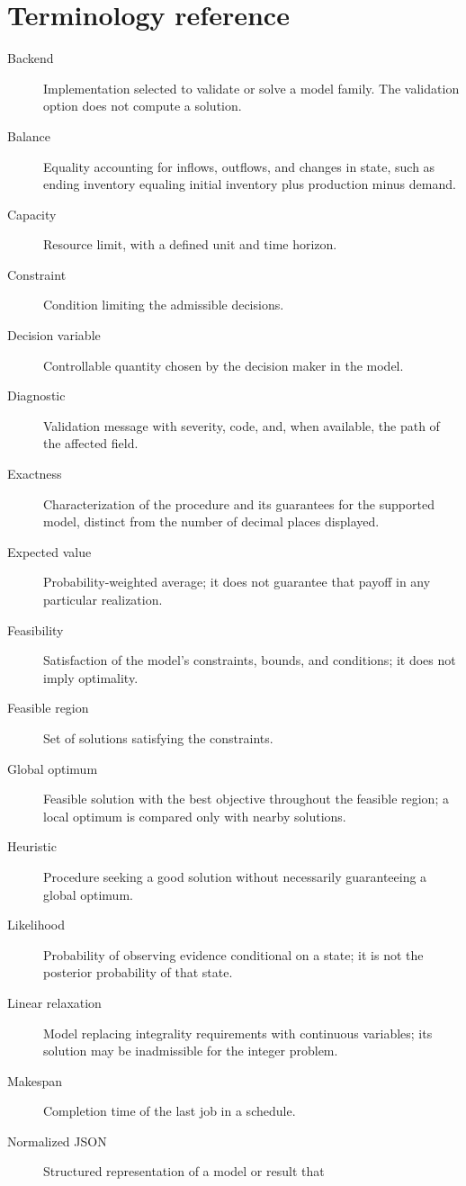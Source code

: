 \chapter{Terminology reference}
\label{chap:terminos}
\begin{description}
 \item[Backend] Implementation selected to validate or solve a model family.
 The validation option does not compute a solution.
 \item[Balance] Equality accounting for inflows, outflows, and changes in state,
 such as ending inventory equaling initial inventory plus production minus demand.
 \item[Capacity] Resource limit, with a defined unit and time horizon.
 \item[Constraint] Condition limiting the admissible decisions.
 \item[Decision variable] Controllable quantity chosen by the decision maker in the model.
 \item[Diagnostic] Validation message with severity, code, and, when available,
 the path of the affected field.
 \item[Exactness] Characterization of the procedure and its guarantees for the
 supported model, distinct from the number of decimal places displayed.
 \item[Expected value] Probability-weighted average; it does not guarantee that
 payoff in any particular realization.
 \item[Feasibility] Satisfaction of the model's constraints, bounds, and
 conditions; it does not imply optimality.
 \item[Feasible region] Set of solutions satisfying the constraints.
 \item[Global optimum] Feasible solution with the best objective throughout the
 feasible region; a local optimum is compared only with nearby solutions.
 \item[Heuristic] Procedure seeking a good solution without necessarily
 guaranteeing a global optimum.
 \item[Likelihood] Probability of observing evidence conditional on a state;
 it is not the posterior probability of that state.
 \item[Linear relaxation] Model replacing integrality requirements with
 continuous variables; its solution may be inadmissible for the integer problem.
 \item[Makespan] Completion time of the last job in a schedule.
 \item[Normalized JSON] Structured representation of a model or result that

\end{description}
